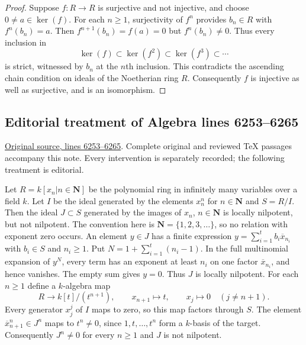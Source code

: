 \begin{proof}
Suppose $f:R\to R$ is surjective and not injective, and choose
$0\ne a\in\ker(f)$. For each $n\geq1$, surjectivity of $f^n$
provides $b_n\in R$ with $f^n(b_n)=a$. Then
$f^{n+1}(b_n)=f(a)=0$ but $f^n(b_n)\ne0$.
Thus every inclusion in
$$
\ker(f)\subset\ker(f^2)\subset\ker(f^3)\subset\cdots
$$
is strict, witnessed by $b_n$ at the $n$th inclusion. This contradicts
the ascending chain condition on ideals of the Noetherian ring $R$.
Consequently $f$ is injective as well as surjective, and is an isomorphism.
\end{proof}










\subsection{Editorial treatment of Algebra lines 6253--6265}

\hypertarget{algebra-context-045}{}

\noindent\href{https://github.com/stacks/stacks-project/blob/a04446e57ec1fbc252a871afcec7752fb2807b14/algebra.tex\#L6253}{Original source, lines 6253--6265}. Complete original and reviewed TeX passages accompany this note. Every intervention is separately recorded; the following treatment is editorial.


\begin{example}
\label{editorial-source-example-locally-nilpotent-not-nilpotent}
Let $R = k[x_n | n \in \mathbf{N}]$ be the polynomial ring in infinitely
many variables over a field $k$. Let $I$ be the ideal generated by
the elements $x_n^n$ for $n \in \mathbf{N}$ and $S = R/I$. Then the ideal
$J \subset S$ generated by the images of $x_n$, $n \in \mathbf{N}$
is locally nilpotent, but not nilpotent. The convention here is
$\mathbf N=\{1,2,3,\ldots\}$, so no relation with exponent zero occurs.
An element $y\in J$ has a finite expression
$y=\sum_{i=1}^t b_i\overline{x}_{n_i}$ with $b_i\in S$ and $n_i\geq1$.
Put $N=1+\sum_{i=1}^t(n_i-1)$. In the full multinomial expansion
of $y^N$, every term has an exponent at least $n_i$ on one factor
$\overline{x}_{n_i}$, and hence vanishes. The empty sum gives $y=0$.
Thus $J$ is locally nilpotent.
For each $n\geq1$ define a $k$-algebra map
$$
R\longrightarrow k[t]/(t^{n+1}),\qquad
x_{n+1}\longmapsto t,\qquad x_j\longmapsto0\quad(j\ne n+1).
$$
Every generator $x_j^j$ of $I$ maps to zero, so this map factors
through $S$. The element $\overline{x}_{n+1}^n\in J^n$ maps to
$t^n\ne0$, since $1,t,\ldots,t^n$ form a $k$-basis of the target.
Consequently $J^n\ne0$ for every $n\geq1$ and $J$ is not nilpotent.
\end{example}


